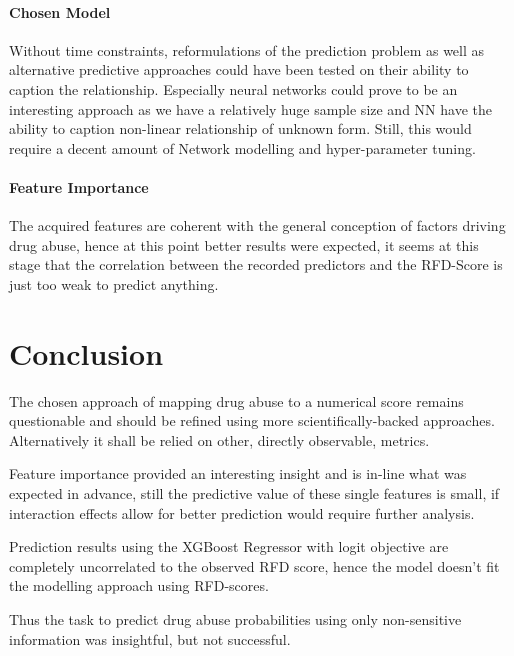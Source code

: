 \documentclass[12pt]{article}
\begin{document}
\paragraph{Chosen Model} 
Without time constraints, reformulations of the prediction problem as well as alternative predictive approaches could have been tested on their ability to caption the relationship. Especially neural networks could prove to be an interesting approach as we have a relatively huge sample size and NN have the ability to caption non-linear relationship of unknown form. Still, this would require a decent amount of Network modelling and hyper-parameter tuning.

\paragraph{Feature Importance}
The acquired features are coherent with the general conception of factors driving drug abuse, hence at this point better results were expected, it seems at this stage that the correlation between the recorded predictors and the RFD-Score is just too weak to predict anything.


%
%
\newpage
\section{Conclusion}
The chosen approach of mapping drug abuse to a numerical score remains questionable and should be refined using more scientifically-backed approaches. Alternatively it shall be relied on other, directly observable, metrics.

Feature importance provided an interesting insight and is in-line what was expected in advance, still the predictive value of these single features is small, if interaction effects allow for better prediction would require further analysis.

Prediction results using the XGBoost Regressor with logit objective are completely uncorrelated to the observed RFD score, hence the model doesn't fit the modelling approach using RFD-scores.

Thus the task to predict drug abuse probabilities using only non-sensitive information was insightful, but not successful.



	
\end{document}
